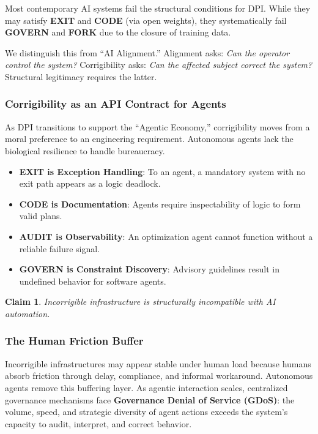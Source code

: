 \documentclass{article}
\newtheorem{claim}{Claim}
\begin{document}
Most contemporary AI systems fail the structural conditions for DPI. While they may satisfy \textbf{EXIT} and \textbf{CODE} (via open weights), they systematically fail \textbf{GOVERN} and \textbf{FORK} due to the closure of training data.

We distinguish this from ``AI Alignment.'' Alignment asks: \textit{Can the operator control the system?} Corrigibility asks: \textit{Can the affected subject correct the system?} Structural legitimacy requires the latter.

\subsubsection{Corrigibility as an API Contract for Agents}
As DPI transitions to support the ``Agentic Economy,'' corrigibility moves from a moral preference to an engineering requirement. Autonomous agents lack the biological resilience to handle bureaucracy.
\begin{itemize}
    \item \textbf{EXIT is Exception Handling}: To an agent, a mandatory system with no exit path appears as a logic deadlock.
    \item \textbf{CODE is Documentation}: Agents require inspectability of logic to form valid plans.
    \item \textbf{AUDIT is Observability}: An optimization agent cannot function without a reliable failure signal.
    \item \textbf{GOVERN is Constraint Discovery}: Advisory guidelines result in undefined behavior for software agents.
\end{itemize}
\begin{claim}
Incorrigible infrastructure is structurally incompatible with AI automation.
\end{claim}

\subsubsection{The Human Friction Buffer}

Incorrigible infrastructures may appear stable under human load because humans absorb friction through delay, compliance, and informal workaround. Autonomous agents remove this buffering layer. As agentic interaction scales, centralized governance mechanisms face \textbf{Governance Denial of Service (GDoS)}: the volume, speed, and strategic diversity of agent actions exceeds the system's capacity to audit, interpret, and correct behavior.
\end{document}
